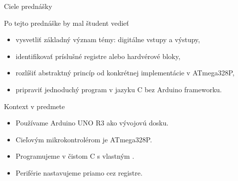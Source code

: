 
\begin{frame}{Ciele prednášky}
\begin{tukebox}{Po tejto prednáške by mal študent vedieť}
\begin{itemize}
    \item vysvetliť základný význam témy: digitálne vstupy a výstupy,
    \item identifikovať príslušné registre alebo hardvérové bloky,
    \item rozlíšiť abstraktný princíp od konkrétnej implementácie v ATmega328P,
    \item pripraviť jednoduchý program v jazyku C bez Arduino frameworku.
\end{itemize}
\end{tukebox}
\end{frame}

\begin{frame}{Kontext v predmete}
\begin{itemize}
    \item Používame Arduino UNO R3 ako vývojovú dosku.
    \item Cieľovým mikrokontrolérom je ATmega328P.
    \item Programujeme v čistom C s vlastným .
    \item Periférie nastavujeme priamo cez registre.
\end{itemize}
\end{frame}
